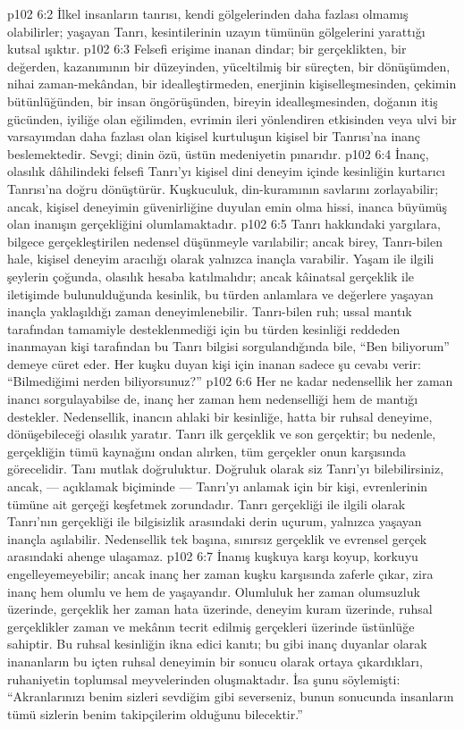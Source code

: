 \vs p102 6:2 İlkel insanların tanrısı, kendi gölgelerinden daha fazlası olmamış olabilirler; yaşayan Tanrı, kesintilerinin uzayın tümünün gölgelerini yarattığı kutsal ışıktır.
\vs p102 6:3 Felsefi erişime inanan dindar; bir gerçeklikten, bir değerden, kazanımının bir düzeyinden, yüceltilmiş bir süreçten, bir dönüşümden, nihai zaman\hyp{}mekândan, bir idealleştirmeden, enerjinin kişiselleşmesinden, çekimin bütünlüğünden, bir insan öngörüşünden, bireyin idealleşmesinden, doğanın itiş gücünden, iyiliğe olan eğilimden, evrimin ileri yönlendiren etkisinden veya ulvi bir varsayımdan daha fazlası olan kişisel kurtuluşun kişisel bir Tanrısı’na inanç beslemektedir. Sevgi; dinin özü, üstün medeniyetin pınarıdır.
\vs p102 6:4 İnanç, olasılık dâhilindeki felsefi Tanrı’yı kişisel dini deneyim içinde kesinliğin kurtarıcı Tanrısı’na doğru dönüştürür. Kuşkuculuk, din\hyp{}kuramının savlarını zorlayabilir; ancak, kişisel deneyimin güvenirliğine duyulan emin olma hissi, inanca büyümüş olan inanışın gerçekliğini olumlamaktadır.
\vs p102 6:5 Tanrı hakkındaki yargılara, bilgece gerçekleştirilen nedensel düşünmeyle varılabilir; ancak birey, Tanrı\hyp{}bilen hale, kişisel deneyim aracılığı olarak yalnızca inançla varabilir. Yaşam ile ilgili şeylerin çoğunda, olasılık hesaba katılmalıdır; ancak kâinatsal gerçeklik ile iletişimde bulunulduğunda kesinlik, bu türden anlamlara ve değerlere yaşayan inançla yaklaşıldığı zaman deneyimlenebilir. Tanrı\hyp{}bilen ruh; ussal mantık tarafından tamamiyle desteklenmediği için bu türden kesinliği reddeden inanmayan kişi tarafından bu Tanrı bilgisi sorgulandığında bile, “Ben biliyorum” demeye cüret eder. Her kuşku duyan kişi için inanan sadece şu cevabı verir: “Bilmediğimi nerden biliyorsunuz?”
\vs p102 6:6 Her ne kadar nedensellik her zaman inancı sorgulayabilse de, inanç her zaman hem nedenselliği hem de mantığı destekler. Nedensellik, inancın ahlaki bir kesinliğe, hatta bir ruhsal deneyime, dönüşebileceği olasılık yaratır. Tanrı ilk gerçeklik ve son gerçektir; bu nedenle, gerçekliğin tümü kaynağını ondan alırken, tüm gerçekler onun karşısında görecelidir. Tanı mutlak doğruluktur. Doğruluk olarak siz Tanrı’yı bilebilirsiniz, ancak, --- açıklamak biçiminde --- Tanrı’yı anlamak için bir kişi, evrenlerinin tümüne ait gerçeği keşfetmek zorundadır. Tanrı gerçekliği ile ilgili olarak Tanrı’nın gerçekliği ile bilgisizlik arasındaki derin uçurum, yalnızca yaşayan inançla aşılabilir. Nedensellik tek başına, sınırsız gerçeklik ve evrensel gerçek arasındaki ahenge ulaşamaz.
\vs p102 6:7 İnanış kuşkuya karşı koyup, korkuyu engelleyemeyebilir; ancak inanç her zaman kuşku karşısında zaferle çıkar, zira inanç hem olumlu ve hem de yaşayandır. Olumluluk her zaman olumsuzluk üzerinde, gerçeklik her zaman hata üzerinde, deneyim kuram üzerinde, ruhsal gerçeklikler zaman ve mekânın tecrit edilmiş gerçekleri üzerinde üstünlüğe sahiptir. Bu ruhsal kesinliğin ikna edici kanıtı; bu gibi inanç duyanlar olarak inananların bu içten ruhsal deneyimin bir sonucu olarak ortaya çıkardıkları, ruhaniyetin toplumsal meyvelerinden oluşmaktadır. İsa şunu söylemişti: “Akranlarınızı benim sizleri sevdiğim gibi severseniz, bunun sonucunda insanların tümü sizlerin benim takipçilerim olduğunu bilecektir.”
